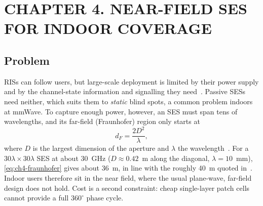 \section*{CHAPTER 4. NEAR-FIELD SES FOR INDOOR COVERAGE}
\setcounter{section}{4}
\setcounter{subsection}{0}
\setcounter{equation}{0}
\setcounter{theorem}{0}
\setcounter{figure}{0}
\setcounter{table}{0}

\subsection{Problem}
RISs can follow users, but large-scale deployment is limited by their power supply and by the channel-state information and signalling they need~\cite{Vaquero2026}. Passive SESs need neither, which suits them to \emph{static} blind spots, a common problem indoors at mmWave. To capture enough power, however, an SES must span tens of wavelengths, and its far-field (Fraunhofer) region only starts at
\begin{equation}\label{eq:ch4-fraunhofer}
d_F = \frac{2D^2}{\lambda},
\end{equation}
where $D$ is the largest dimension of the aperture and $\lambda$ the wavelength~\cite[Ch.~2]{Balanis2016}. For a $30\lambda \times 30\lambda$ SES at about 30~GHz ($D \approx 0.42$~m along the diagonal, $\lambda = 10$~mm), \eqref{eq:ch4-fraunhofer} gives about 36~m, in line with the roughly 40~m quoted in~\cite{Vaquero2026}. Indoor users therefore sit in the near field, where the usual plane-wave, far-field design does not hold. Cost is a second constraint: cheap single-layer patch cells cannot provide a full $360^\circ$ phase cycle.


